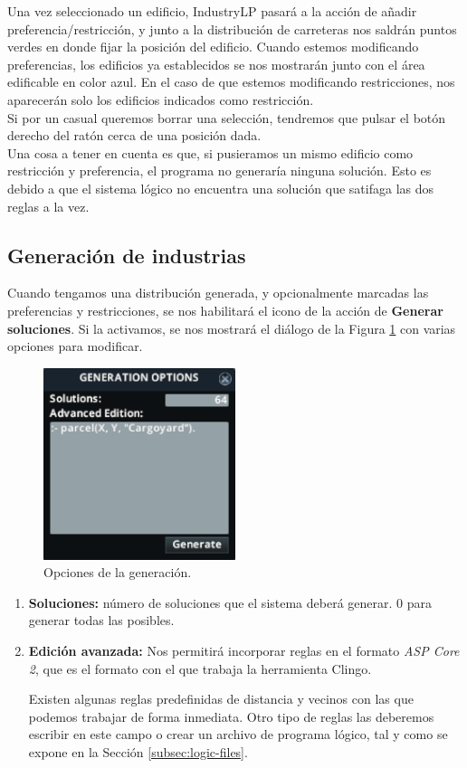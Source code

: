 Una vez seleccionado un edificio, IndustryLP pasará a la acción de añadir preferencia/restricción, y junto a la distribución de carreteras nos saldrán puntos verdes en donde fijar la posición del edificio. Cuando estemos modificando preferencias, los edificios ya establecidos se nos mostrarán junto con el área edificable en color azul. En el caso de que estemos modificando restricciones, nos aparecerán solo los edificios indicados como restricción. \\

Si por un casual queremos borrar una selección, tendremos que pulsar el botón derecho del ratón cerca de una posición dada. \\

Una cosa a tener en cuenta es que, si pusieramos un mismo edificio como restricción y preferencia, el programa no generaría ninguna solución. Esto es debido a que el sistema lógico no encuentra una solución que satifaga las dos reglas a la vez.

\subsection{Generación de industrias}

Cuando tengamos una distribución generada, y opcionalmente marcadas las preferencias y restricciones, se nos habilitará el icono de la acción de \textbf{Generar soluciones}. Si la activamos, se nos mostrará el diálogo de la Figura \ref{fig:dialog} con varias opciones para modificar.

\begin{figure}[h]
	\centering
	\includegraphics[width=0.5\textwidth]{images/dialog}
	\caption{Opciones de la generación.}
	\label{fig:dialog}
\end{figure}

\begin{enumerate}
    \item \textbf{Soluciones:} número de soluciones que el sistema deberá generar. 0 para generar todas las posibles.
    \item \textbf{Edición avanzada:} Nos permitirá incorporar reglas en el formato \textit{ASP Core 2}, que es el formato con el que trabaja la herramienta Clingo.
    
    Existen algunas reglas predefinidas de distancia y vecinos con las que podemos trabajar de forma inmediata. Otro tipo de reglas las deberemos escribir en este campo o crear un archivo de programa lógico, tal y como se expone en la Sección \ref{subsec:logic-files}.
\end{enumerate}


